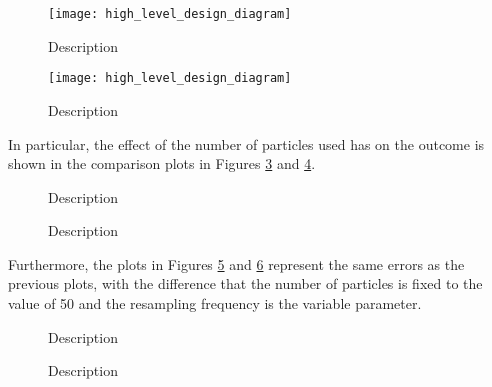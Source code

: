 \begin{figure}
    \centering
    \texttt{[image: high\_level\_design\_diagram]}
    \caption[Name]{
        Description
    }
    \label{fig:terrain_1}
\end{figure}

\begin{figure}
    \centering
    \texttt{[image: high\_level\_design\_diagram]}
    \caption[Name]{
        Description
    }
    \label{fig:bird_1}
\end{figure}

In particular, the effect of the number of particles used has on
the outcome is shown in the comparison plots in Figures
\ref{fig:mean_error_vs_particles_1} and \ref{fig:std_error_vs_particles_1}.

\begin{figure}
    \centering
    
    \caption[Name]{
        Description
    }
    \label{fig:mean_error_vs_particles_1}
\end{figure}

\begin{figure}
    \centering
    
    \caption[Name]{
        Description
    }
    \label{fig:std_error_vs_particles_1}
\end{figure}

Furthermore, the plots in Figures \ref{fig:mean_error_vs_resampling_1} and
\ref{fig:std_error_vs_resampling_1} represent the same errors as the previous
plots, with the difference that the number of particles is fixed to the
value of 50 and the resampling frequency is the variable parameter.

\begin{figure}
    \centering
    
    \caption[Name]{
        Description
    }
    \label{fig:mean_error_vs_resampling_1}
\end{figure}

\begin{figure}
    \centering
    
    \caption[Name]{
        Description
    }
    \label{fig:std_error_vs_resampling_1}
\end{figure}

